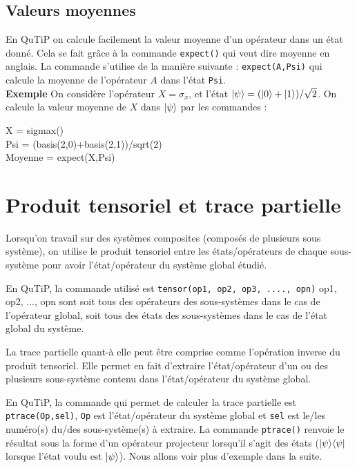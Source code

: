 \subsection{Valeurs moyennes}

En QuTiP on calcule facilement la valeur moyenne d'un opérateur dans un état donné. Cela se fait grâce à la commande \texttt{expect()} qui veut dire moyenne en anglais. La commande s'utilise de la manière suivante : \texttt{expect(A,Psi)} qui calcule la moyenne de l'opérateur $A$ dans l'état \texttt{Psi}.\\
\textbf{Exemple}
On considère l'opérateur $X=\sigma_x$, et l'état $\vert\psi\rangle=(\vert0\rangle+\vert1\rangle)/\sqrt{2}$. On calcule la valeur moyenne de $X$ dans $\vert\psi\rangle$ par les commandes :\\
\begin{tt}
X = sigmax()\\
Psi = (basis(2,0)+basis(2,1))/sqrt(2)\\
Moyenne = expect(X,Psi)\\
\end{tt}

\section{Produit tensoriel et trace partielle}

Lorsqu'on travail sur des systèmes composites (composés de plusieurs sous système), on utilise le produit tensoriel entre les états/opérateurs de chaque sous-système pour avoir l'état/opérateur du système global étudié.

En QuTiP, la commande utilisé est \texttt{tensor(op1, op2, op3, ...., opn)} op1, op2, ..., opn sont soit tous des opérateurs des sous-systèmes dans le cas de l'opérateur global, soit tous des états des sous-systèmes dans le cas de l'état global du système.

La trace partielle quant-à elle peut être comprise comme l'opération inverse du produit tensoriel. Elle permet en fait d'extraire l'état/opérateur d'un ou des plusieurs sous-système contenu dans l'état/opérateur du système global.

En QuTiP, la commande qui permet de calculer la trace partielle est \texttt{ptrace(Op,sel)}, \texttt{Op} est l'état/opérateur du système global et \texttt{sel} est le/les numéro(s) du/des sous-système(s) à extraire. La commande \texttt{ptrace()} renvoie le résultat sous la forme d'un opérateur projecteur lorsqu'il s'agit des états ($\vert\psi\rangle\langle\psi\vert$ lorsque l'état voulu est $\vert\psi\rangle$). Nous allons voir plus d'exemple dans la suite.
